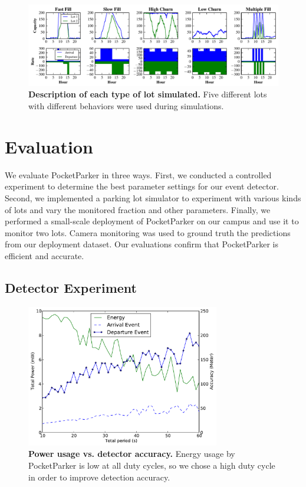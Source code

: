 \begin{figure}[t]
\centering
\includegraphics[width=\textwidth]{./simulator/figures/lots.pdf}

\caption{\textbf{Description of each type of lot simulated.} Five different
lots with different behaviors were used during simulations.}

\label{fig-lotsdescription}
\end{figure}

\section{Evaluation}
\label{sec-evaluation}

We evaluate PocketParker in three ways. First, we conducted a controlled
experiment to determine the best parameter settings for our event detector.
Second, we implemented a parking lot simulator to experiment with various
kinds of lots and vary the monitored fraction and other parameters. Finally,
we performed a small-scale deployment of PocketParker on our campus and use
it to monitor two lots. Camera monitoring was used to ground truth the
predictions from our deployment dataset. Our evaluations confirm that
PocketParker is efficient and accurate.

\subsection{Detector Experiment}

\begin{figure}[t]
\centering
\includegraphics[width=3.325in]{./figures/Energy_accuracy.pdf}

\caption{\textbf{Power usage vs. detector accuracy.} Energy usage by
PocketParker is low at all duty cycles, so we chose a high duty cycle in
order to improve detection accuracy.}

\label{fig-energy}
\end{figure}


